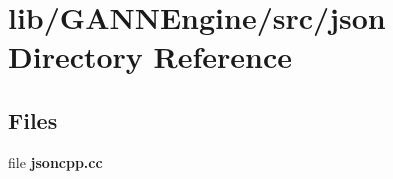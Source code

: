 \section{lib/\+G\+A\+N\+N\+Engine/src/json Directory Reference}
\label{dir_959bc02ea83914de1cfc5bf1cb42faed}
\subsection*{Files}
\begin{DoxyCompactItemize}
\item 
file {\bfseries jsoncpp.\+cc}
\end{DoxyCompactItemize}
